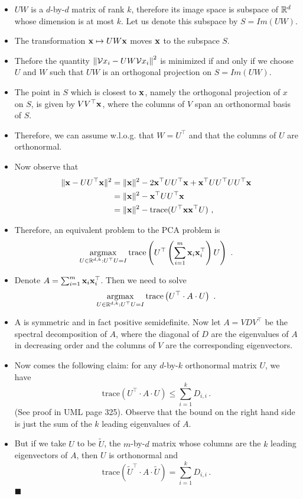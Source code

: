 \begin{itemize}
  \item $UW$ is a $d$-by-$d$ matrix of rank $k$, therefore its image space 
    is subspace of $\mathbb{R}^d$ whose dimension is at most $k$.
    Let us denote this subspace by $S=Im(UW)$.
  \item The transformation ${\mathbf x} \mapsto UW{\mathbf x}$ moves ${\mathbf x}$ to the subspace $S$.
  \item Thefore the quantity 
    $\left\| \mathcal{V}{x}_i - UW\mathcal{V}{x}_i\right\|^2$ is minimized if and only if we choose $U$ and
    $W$ such that $UW$ is an orthogonal projection on $S=Im(UW)$.
  \item The point in $S$ which is closest to ${\mathbf x}$, namely the orthogonal
    projection of $x$ on $S$, is given by $V V^\top {\mathbf x}$, 
    where the columns of $V$ span an orthonormal basis of $S$.
\item Therefore, we can assume w.l.o.g. that $W = U^\top$ and that 
  the columns of
  $U$ are orthonormal.
\item Now observe that 
\[
\begin{split}
\|{\mathbf x} - U U^\top {\mathbf x}\|^2 &= \|{\mathbf x}\|^2 - 2 {\mathbf x}^\top U U^\top {\mathbf x} + {\mathbf x}^\top U
U^\top U U^\top {\mathbf x} \\
&= \|{\mathbf x}\|^2 - {\mathbf x}^\top U U^\top {\mathbf x} \\
&= \|{\mathbf x}\|^2 - \mathrm{trace}(U^\top {\mathbf x} {\mathbf x}^\top U) ~,
\end{split}
\]
\item Therefore, an equivalent problem to the PCA problem is
\[
\operatorname*{argmax}_{U \in \mathbb{R}^{d,k} : U^\top U = I} \mathrm{trace}\left(U^\top
\left(\sum_{i=1}^m {\mathbf x}_i {\mathbf x}_i^\top \right) U\right) ~.
\]
\item Denote $A = \sum_{i=1}^m {\mathbf x}_i {\mathbf x}_i^\top$. Then we need to solve
\[
\operatorname*{argmax}_{U \in \mathbb{R}^{d,k} : U^\top U = I} \mathrm{trace}\left(U^\top
\cdot A \cdot U\right) ~.
\]
\item A is symmetric and in fact positive semidefinite. 
  Now let $A=VDV^\top$ be the spectral decomposition of $A$, where the diagonal
  of $D$ are the eigenvalues of $A$ in decreasing order and the columns of $V$
  are the corresponding eigenvectors. 
\item Now comes the following claim: 
  for any $d$-by-$k$ orthonormal matrix $U$, we have
  \[
 \mathrm{trace}\left(U^\top
 \cdot A \cdot U\right) \leq \sum_{i=1}^k D_{i,i}\,.
  \]
  (See proof in UML page 325). Observe that the bound on the right hand side 
  is just the sum of the $k$ leading eigenvalues of $A$.
\item But if we take $U$ to be $\tilde{U}$, the $m$-by-$d$ matrix whose columns are the $k$
  leading eigenvectors of $A$, then $U$ is orthonormal and 
 \[
   \mathrm{trace}\left(\tilde{U}^\top
   \cdot A \cdot \tilde{U}\right) = \sum_{i=1}^k D_{i,i}\,.
 \]
  $\blacksquare$
\end{itemize}


